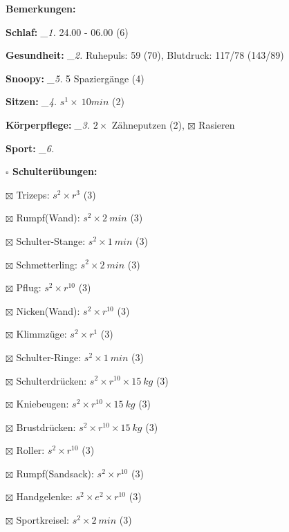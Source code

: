\documentclass[10pt,a4paper]{article}
\newcommand\prop[1] {{\color {alizarin} {\bf #1}}}             %
\newcommand\mand[1] {{\color {burntorange} {\bf #1}}}          %
\newcommand\topspace{\vskip -15pt \hskip 20pt}
\newcommand\n[1] { {\sl #1.} \hskip 5pt }
\begin{document}
\begin{mdframed}[style=daystyle]
  \begin{labeling}{{\mand {Bemerkungen:}}}
    \setlength\itemsep{-3pt}
  \item[{\mand {Schlaf:}}]        \n{\_1} 24.00 - 06.00 (6)
  \item[{\mand {Gesundheit:}}]    \n{\_2} Ruhepuls: 59 (70), Blutdruck: 117/78 (143/89)
  \item[{\mand {Snoopy:}}]        \n{\_5} 5 Spaziergänge (4)
  \item[{\mand {Sitzen:}}]        \n{\_4} $s^1 \times\ 10 min$ (2)
  \item[{\mand {Körperpflege:}}]  \n{\_3} $2 \times$ Zähneputzen (2), $\boxtimes$ Rasieren
  \item[{\mand {Sport:}}]         \n{\_6}
    \topspace
    \begin{minipage}{0.75\textwidth}  
      \begin{labeling}{\prop {$\square$ {Schulterübungen:}}} 
        \setlength\itemsep{-3pt}
      \item[$\boxtimes$ Trizeps:]         $s^2 \times r^{3}$ (3)
      \item[$\boxtimes$ Rumpf(Wand):]     $s^2 \times 2\ min$ (3)
      \item[$\boxtimes$ Schulter-Stange:] $s^2 \times 1\ min$ (3)
      \item[$\boxtimes$ Schmetterling:]   $s^2 \times 2\ min$ (3)
      \item[$\boxtimes$ Pflug:]           $s^2 \times r^{10}$ (3)
      \item[$\boxtimes$ Nicken(Wand):]    $s^2 \times r^{10}$ (3)
      \item[$\boxtimes$ Klimmzüge:]       $s^2 \times r^1$ (3)
      \item[$\boxtimes$ Schulter-Ringe:]  $s^2 \times 1\ min$ (3)
      \item[$\boxtimes$ Schulterdrücken:] $s^2 \times r^{10} \times 15\ kg$ (3)
      \item[$\boxtimes$ Kniebeugen:]      $s^2 \times r^{10} \times 15\ kg$ (3)
      \item[$\boxtimes$ Brustdrücken:]    $s^2 \times r^{10} \times 15\ kg$ (3)
      \item[$\boxtimes$ Roller:]          $s^2 \times r^{10}$ (3)
      \item[$\boxtimes$ Rumpf(Sandsack):] $s^2 \times r^{10}$ (3)
      \item[$\boxtimes$ Handgelenke:]     $s^2 \times e^2 \times r^{10}$ (3)
      \item[$\boxtimes$ Sportkreisel:]    $s^2 \times 2\ min$ (3)

\end{labeling}
\end{minipage}
\end{labeling}
\end{mdframed}
\end{document}
